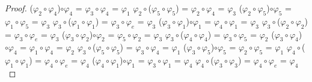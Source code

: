 \documentclass[10pt,a4paper,oneside]{article}
\begin{document}
\begin{proof}
				\newline
				($\varphi_{2}\circ\varphi_{4}$)$\circ\varphi_{4}$ = $\varphi_{3}\circ\varphi_{4}$ = $\varphi_{1}$
				\newline
				\newline
				$\varphi_{2}\circ$($\varphi_{5}\circ\varphi_{5}$) = $\varphi_{2}\circ\varphi_{4}$ = $\varphi_{3}$
				\newline
				($\varphi_{2}\circ\varphi_{5}$)$\circ\varphi_{5}$ = $\varphi_{1}\circ\varphi_{5}$ = $\varphi_{3}$
				\newline
				\newline
				$\varphi_{3}\circ$($\varphi_{1}\circ\varphi_{1}$) = $\varphi_{3}\circ\varphi_{e}$ = $\varphi_{3}$
				\newline
				($\varphi_{3}\circ\varphi_{1}$)$\circ\varphi_{1}$ = $\varphi_{4}\circ\varphi_{1}$ = $\varphi_{3}$
				\newline
				\newline
				$\varphi_{3}\circ$($\varphi_{2}\circ\varphi_{2}$) = $\varphi_{3}\circ\varphi_{e}$ = $\varphi_{3}$
				\newline
				($\varphi_{3}\circ\varphi_{2}$)$\circ\varphi_{2}$ = $\varphi_{5}\circ\varphi_{2}$ = $\varphi_{3}$
				\newline
				\newline
				$\varphi_{3}\circ$($\varphi_{4}\circ\varphi_{4}$) = $\varphi_{3}\circ\varphi_{5}$ = $\varphi_{2}$
				\newline
				($\varphi_{3}\circ\varphi_{4}$)$\circ\varphi_{4}$ = $\varphi_{1}\circ\varphi_{4}$ = $\varphi_{2}$
				\newline
				\newline
				$\varphi_{3}\circ$($\varphi_{5}\circ\varphi_{5}$) = $\varphi_{3}\circ\varphi_{4}$ = $\varphi_{1}$
				\newline
				($\varphi_{3}\circ\varphi_{5}$)$\circ\varphi_{5}$ = $\varphi_{2}\circ\varphi_{5}$ = $\varphi_{1}$
				\newline
				\newline
				$\varphi_{4}\circ$($\varphi_{1}\circ\varphi_{1}$) = $\varphi_{4}\circ\varphi_{e}$ = $\varphi_{4}$
				\newline
				($\varphi_{4}\circ\varphi_{1}$)$\circ\varphi_{1}$ = $\varphi_{3}\circ\varphi_{1}$ = $\varphi_{4}$
				\newline
				\newline
				$\varphi_{4}\circ$($\varphi_{3}\circ\varphi_{3}$) = $\varphi_{4}\circ\varphi_{e}$ = $\varphi_{4}$
				\newline

\end{proof}
\end{document}
